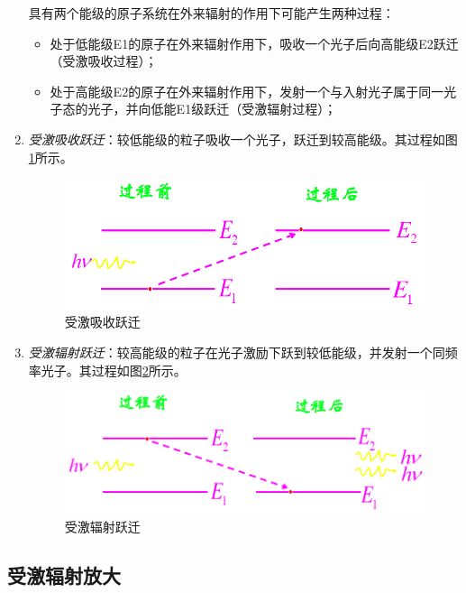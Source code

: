 \begin{enumerate}
		具有两个能级的原子系统在外来辐射的作用下可能产生两种过程：\begin{itemize}
			\item 处于低能级E1的原子在外来辐射作用下，吸收一个光子后向高能级E2跃迁（受激吸收过程）；
			\item 处于高能级E2的原子在外来辐射作用下，发射一个与入射光子属于同一光子态的光子，并向低能E1级跃迁（受激辐射过程）；
		\end{itemize} %
	\item 
		\textit{受激吸收跃迁}：较低能级的粒子吸收一个光子，跃迁到较高能级。其过程如图\ref{fig:受激吸收跃迁}所示。
		\begin{figure}[htbp]
			\centering
			\includegraphics[width=0.7\linewidth]{figure/Chapter2/受激吸收跃迁}
			\caption{受激吸收跃迁}
			\label{fig:受激吸收跃迁}
		\end{figure}
	\item 
		\textit{受激辐射跃迁}：较高能级的粒子在光子激励下跃到较低能级，并发射一个同频率光子。其过程如图\ref{fig:受激辐射跃迁}所示。
		\begin{figure}[htbp]
			\centering
			\includegraphics[width=0.7\linewidth]{figure/Chapter2/受激辐射跃迁}
			\caption{受激辐射跃迁}
			\label{fig:受激辐射跃迁}
		\end{figure}
\end{enumerate} %

\subsection{受激辐射放大} %
